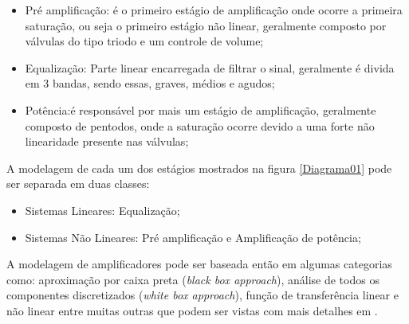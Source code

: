 \begin{itemize}
	\item Pré amplificação: é o primeiro estágio de amplificação onde ocorre a primeira saturação, ou seja o primeiro estágio não linear, geralmente composto por válvulas do tipo triodo e um controle de volume;
	\item Equalização: Parte linear encarregada de filtrar o sinal, geralmente é divida em 3 bandas, sendo essas, graves, médios e agudos;
	\item Potência:é responsável por mais um estágio de amplificação, geralmente composto de pentodos, onde a saturação ocorre devido a uma forte não linearidade presente nas válvulas;
\end{itemize}

A modelagem de cada um dos estágios mostrados na figura \ref{Diagrama01} pode ser separada em duas classes:

\begin{itemize}
	\item Sistemas Lineares: Equalização;
	\item Sistemas Não Lineares: Pré amplificação e Amplificação de potência; 
\end{itemize}


A modelagem de amplificadores pode ser baseada então em algumas categorias como: aproximação por caixa preta (\textit{black box approach}), análise de todos os componentes discretizados (\textit{white box approach}), função de transferência linear e não linear entre muitas outras que podem ser vistas com mais detalhes em \cite{pakarinen2009review}.

